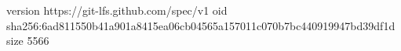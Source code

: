 version https://git-lfs.github.com/spec/v1
oid sha256:6ad811550b41a901a8415ea06cb04565a157011c070b7bc440919947bd39df1d
size 5566
